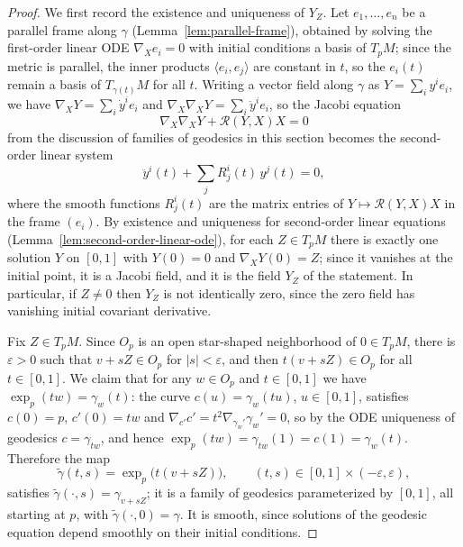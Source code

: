\begin{proof}
\leanok
We first record the existence and uniqueness of $Y_Z$. Let
$e_1,\ldots,e_n$ be a parallel frame along $\gamma$
(Lemma~\ref{lem:parallel-frame}), obtained by
solving the first-order linear ODE $\nabla_Xe_i=0$ with initial
conditions a basis of $T_pM$; since the metric is parallel, the
inner products $\langle e_i,e_j\rangle$ are constant in $t$, so the
$e_i(t)$ remain a basis of $T_{\gamma(t)}M$ for all $t$. Writing a
vector field along $\gamma$ as $Y=\sum_iy^ie_i$, we have
$\nabla_XY=\sum_i\dot y^ie_i$ and
$\nabla_X\nabla_XY=\sum_i\ddot y^ie_i$, so the Jacobi equation
$$\nabla_X\nabla_XY+{\mathcal R}(Y,X)X=0$$
from the discussion of families of geodesics in this section
becomes the second-order linear system
$$\ddot y^i(t)+\sum_jR^i_j(t)\,y^j(t)=0,$$
where the smooth functions $R^i_j(t)$ are the matrix entries of
$Y\mapsto{\mathcal R}(Y,X)X$ in the frame $(e_i)$. By existence and
uniqueness for second-order linear equations
(Lemma~\ref{lem:second-order-linear-ode}), for each $Z\in T_pM$
there is exactly one
solution $Y$ on $[0,1]$ with $Y(0)=0$ and $\nabla_XY(0)=Z$; since
it vanishes at the initial point, it is a Jacobi field, and it is
the field $Y_Z$ of the statement. In particular, if $Z\neq0$ then
$Y_Z$ is not identically zero, since the zero field has vanishing
initial covariant derivative.

Fix $Z\in T_pM$. Since $O_p$ is an open star-shaped neighborhood
of $0\in T_pM$, there is $\varepsilon>0$ such that $v+sZ\in O_p$
for $|s|<\varepsilon$, and then $t(v+sZ)\in O_p$ for all
$t\in[0,1]$. We claim that for any $w\in O_p$ and $t\in[0,1]$ we
have $\exp_p(tw)=\gamma_w(t)$: the curve $c(u)=\gamma_w(tu)$,
$u\in[0,1]$, satisfies $c(0)=p$, $c'(0)=tw$ and
$\nabla_{c'}c'=t^2\nabla_{\gamma_w'}\gamma_w'=0$, so by the ODE
uniqueness of geodesics $c=\gamma_{tw}$, and hence
$\exp_p(tw)=\gamma_{tw}(1)=c(1)=\gamma_w(t)$. Therefore the map
$$\tilde\gamma(t,s)=\exp_p\bigl(t(v+sZ)\bigr),\qquad
(t,s)\in[0,1]\times(-\varepsilon,\varepsilon),$$
satisfies $\tilde\gamma(\cdot,s)=\gamma_{v+sZ}$; it is a family of
geodesics parameterized by $[0,1]$, all starting at $p$, with
$\tilde\gamma(\cdot,0)=\gamma$. It is smooth, since solutions of
the geodesic equation depend smoothly on their initial conditions.


\end{proof}
